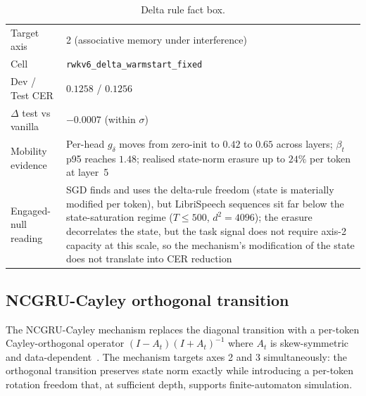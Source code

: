\begin{table}[h]
\centering
\small
\caption[Delta rule engaged-null entry]{Delta rule fact box.}
\label{tab:engaged-null:delta}
\setlength{\tabcolsep}{6pt}
\renewcommand{\arraystretch}{1.05}
\begin{tabularx}{\linewidth}{@{}p{3.3cm} X@{}}
\toprule
Target axis & 2 (associative memory under interference) \\
Cell & \texttt{rwkv6\_delta\_warmstart\_fixed} \\
Dev / Test CER & $0.1258$ / $0.1256$ \\
$\Delta$ test vs vanilla & $-0.0007$ (within $\sigma$) \\
Mobility evidence & Per-head $g_{\delta}$ moves from zero-init to
$0.42$ to $0.65$ across layers; $\beta_{t}$ p95 reaches $1.48$;
realised state-norm erasure up to $24\%$ per token at layer~5 \\
Engaged-null reading & SGD finds and uses the delta-rule
freedom (state is materially modified per token), but LibriSpeech
sequences sit far below the state-saturation regime ($T \le 500$,
$d^{2} = 4096$); the erasure decorrelates the state, but the task
signal does not require axis-2 capacity at this scale, so the
mechanism's modification of the state does not translate into CER
reduction \\
\bottomrule
\end{tabularx}
\end{table}

\subsection{NCGRU-Cayley orthogonal transition}\label{app:engaged-null:cayley}

The NCGRU-Cayley mechanism replaces the diagonal transition with a
per-token Cayley-orthogonal operator
$(I - A_{t})(I + A_{t})^{-1}$ where $A_{t}$ is skew-symmetric and
data-dependent~\cite{mucllari2025crt}. The mechanism targets axes
2 and 3 simultaneously: the orthogonal transition preserves state
norm exactly while introducing a per-token rotation freedom that, at
sufficient depth, supports finite-automaton simulation.

